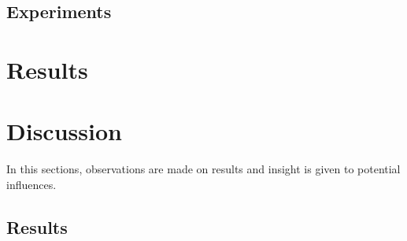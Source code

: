 \documentclass[conference]{IEEEtran}
\begin{document}
	


\subsection{Experiments} \label{Experiments}



\section{Results} \label{Results}








\section{Discussion} \label{Discussion}
In this sections, observations are made on results and insight is given to potential influences.

\subsection{Results}
\end{document}
